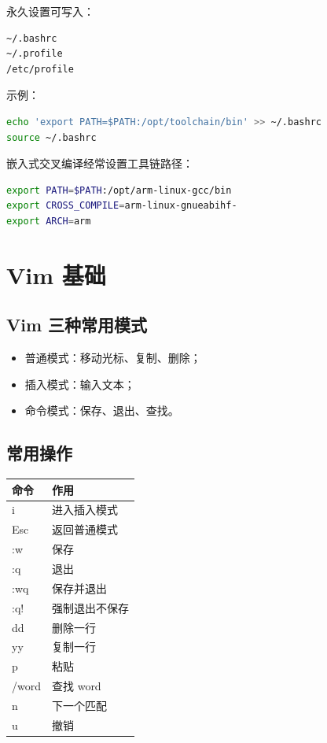 \documentclass[UTF8,a4paper,12pt]{ctexart}
\begin{document}
永久设置可写入：

\begin{lstlisting}[language=bash]
~/.bashrc
~/.profile
/etc/profile
\end{lstlisting}

示例：

\begin{lstlisting}[language=bash]
echo 'export PATH=$PATH:/opt/toolchain/bin' >> ~/.bashrc
source ~/.bashrc
\end{lstlisting}

嵌入式交叉编译经常设置工具链路径：

\begin{lstlisting}[language=bash]
export PATH=$PATH:/opt/arm-linux-gcc/bin
export CROSS_COMPILE=arm-linux-gnueabihf-
export ARCH=arm
\end{lstlisting}

\section{Vim 基础}

\subsection{Vim 三种常用模式}

\begin{itemize}
    \item 普通模式：移动光标、复制、删除；
    \item 插入模式：输入文本；
    \item 命令模式：保存、退出、查找。
\end{itemize}

\subsection{常用操作}

\begin{longtable}{p{4cm}p{10cm}}
\toprule
命令 & 作用 \\
\midrule
i & 进入插入模式 \\
Esc & 返回普通模式 \\
:w & 保存 \\
:q & 退出 \\
:wq & 保存并退出 \\
:q! & 强制退出不保存 \\
dd & 删除一行 \\
yy & 复制一行 \\
p & 粘贴 \\
/word & 查找 word \\
n & 下一个匹配 \\
u & 撤销 \\
\bottomrule
\end{longtable}
\end{document}

